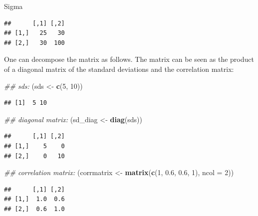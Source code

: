 \documentclass[12pt,]{krantz}
\newenvironment{Shaded}{\begin{snugshade}}{\end{snugshade}}
\newcommand{\CommentTok}[1]{\textcolor[rgb]{0.56,0.35,0.01}{\textit{#1}}}
\newcommand{\DataTypeTok}[1]{\textcolor[rgb]{0.13,0.29,0.53}{#1}}
\newcommand{\DecValTok}[1]{\textcolor[rgb]{0.00,0.00,0.81}{#1}}
\newcommand{\FloatTok}[1]{\textcolor[rgb]{0.00,0.00,0.81}{#1}}
\newcommand{\KeywordTok}[1]{\textcolor[rgb]{0.13,0.29,0.53}{\textbf{#1}}}
\newcommand{\NormalTok}[1]{#1}
\newcommand{\StringTok}[1]{\textcolor[rgb]{0.31,0.60,0.02}{#1}}
\begin{document}
\begin{Shaded}
\begin{Highlighting}[]
\NormalTok{Sigma}
\end{Highlighting}
\end{Shaded}

\begin{verbatim}
##      [,1] [,2]
## [1,]   25   30
## [2,]   30  100
\end{verbatim}

One can decompose the matrix as follows. The matrix can be seen as the product of a diagonal matrix of the standard deviations and the correlation matrix:

\begin{Shaded}
\begin{Highlighting}[]
\CommentTok{## sds:}
\NormalTok{(sds <-}\StringTok{ }\KeywordTok{c}\NormalTok{(}\DecValTok{5}\NormalTok{, }\DecValTok{10}\NormalTok{))}
\end{Highlighting}
\end{Shaded}

\begin{verbatim}
## [1]  5 10
\end{verbatim}

\begin{Shaded}
\begin{Highlighting}[]
\CommentTok{## diagonal matrix:}
\NormalTok{(sd_diag <-}\StringTok{ }\KeywordTok{diag}\NormalTok{(sds))}
\end{Highlighting}
\end{Shaded}

\begin{verbatim}
##      [,1] [,2]
## [1,]    5    0
## [2,]    0   10
\end{verbatim}

\begin{Shaded}
\begin{Highlighting}[]
\CommentTok{## correlation matrix:}
\NormalTok{(corrmatrix <-}\StringTok{ }\KeywordTok{matrix}\NormalTok{(}\KeywordTok{c}\NormalTok{(}\DecValTok{1}\NormalTok{, }\FloatTok{0.6}\NormalTok{, }\FloatTok{0.6}\NormalTok{, }\DecValTok{1}\NormalTok{), }
  \DataTypeTok{ncol =} \DecValTok{2}\NormalTok{))}
\end{Highlighting}
\end{Shaded}

\begin{verbatim}
##      [,1] [,2]
## [1,]  1.0  0.6
## [2,]  0.6  1.0
\end{verbatim}
\end{document}

